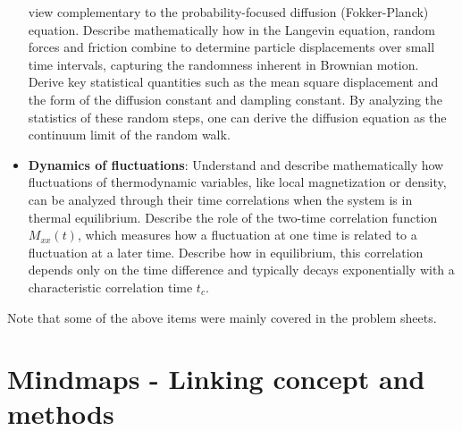 \documentclass[
  letterpaper,
  enabledeprecatedfontcommands]{report}
\begin{document}
\begin{itemize}
  view complementary to the probability-focused diffusion
  (Fokker-Planck) equation. Describe mathematically how in the Langevin
  equation, random forces and friction combine to determine particle
  displacements over small time intervals, capturing the randomness
  inherent in Brownian motion. Derive key statistical quantities such as
  the mean square displacement and the form of the diffusion constant
  and dampling constant. By analyzing the statistics of these random
  steps, one can derive the diffusion equation as the continuum limit of
  the random walk.
\item
  \textbf{Dynamics of fluctuations}: Understand and describe
  mathematically how fluctuations of thermodynamic variables, like local
  magnetization or density, can be analyzed through their time
  correlations when the system is in thermal equilibrium. Describe the
  role of the two-time correlation function \(M_{xx}(t)\), which
  measures how a fluctuation at one time is related to a fluctuation at
  a later time. Describe how in equilibrium, this correlation depends
  only on the time difference and typically decays exponentially with a
  characteristic correlation time \(t_c\).
\end{itemize}

Note that some of the above items were mainly covered in the problem
sheets.

\chapter{Mindmaps - Linking concept and
methods}\label{mindmaps---linking-concept-and-methods}
\end{document}
